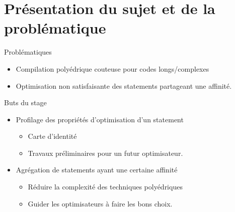 \documentclass[5pt, compress]{beamer}
\makeatletter
\newcommand*{\currentname}{\@currentlabelname}
\makeatother
\begin{document}
\section{Présentation du sujet et de la problématique}
    \begin{frame}{\currentname}
        \begin{block}{Problématiques}
            \vspace{-1em}
            \begin{itemize} \itemsep0em
                \item {Compilation polyédrique couteuse pour codes longs/complexes}
                \item {Optimisation non satisfaisante des statements partageant une affinité.}
            \end{itemize}
        \end{block}

        \pause

        \begin{block}{Buts du stage}
            \vspace{-1em}
            \begin{itemize} \itemsep0em
                \item {Profilage des propriétés d'optimisation d'un statement} 
                    \begin{itemize}
                        \item Carte d'identité
                        \item Travaux préliminaires pour un futur optimisateur.
                    \end{itemize}
                \item {Agrégation de statements ayant une certaine affinité}
                    \begin{itemize}
                        \item {Réduire la complexité des techniques polyédriques}
                        \item {Guider les optimisateurs à faire les bons choix.}
                    \end{itemize}
            \end{itemize}
        \end{block}
    \end{frame}

\end{document}
